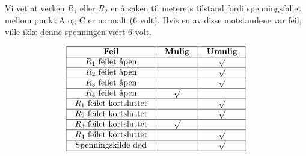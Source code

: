 
Vi vet at verken $R_1$ eller $R_2$ er årsaken til meterets tilstand fordi spenningsfallet mellom punkt A og C er normalt (6 volt).  Hvis en av disse motstandene var feil, ville ikke denne spenningen vært 6 volt.


$$\vbox{\offinterlineskip
\halign{\strut
\vrule \quad\hfil # \ \hfil & 
\vrule \quad\hfil # \ \hfil & 
\vrule \quad\hfil # \ \hfil \vrule \cr
\noalign{\hrule}
%
{\bf Feil} & {\bf Mulig} & {\bf Umulig} \cr
%
\noalign{\hrule}
%
$R_1$ feilet åpen &  & $\surd$ \cr
%
\noalign{\hrule}
%
$R_2$ feilet åpen &  & $\surd$ \cr
%
\noalign{\hrule}
%
$R_3$ feilet åpen &  & $\surd$ \cr
%
\noalign{\hrule}
%
$R_4$ feilet åpen & $\surd$ &  \cr
%
\noalign{\hrule}
%
$R_1$ feilet kortsluttet &  & $\surd$ \cr
%
\noalign{\hrule}
%
$R_2$ feilet kortsluttet &  & $\surd$ \cr
%
\noalign{\hrule}
%
$R_3$ feilet kortsluttet & $\surd$ &  \cr
%
\noalign{\hrule}
%
$R_4$ feilet kortsluttet &  & $\surd$ \cr
%
\noalign{\hrule}
%
Spenningskilde død &  & $\surd$ \cr
%
\noalign{\hrule}
} %
}$$ %


